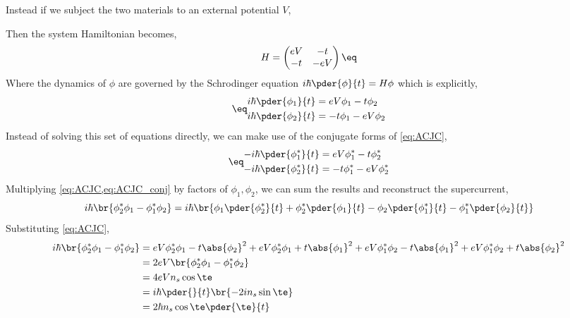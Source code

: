 \documentclass{article}
\begin{document}
Instead if we subject the two materials to an external potential $V$,
\begin{center}
\end{center}

Then the system Hamiltonian becomes,
\[ H = \begin{pmatrix}
    e V & - t \\
    -t & - e V
\end{pmatrix} \eq \label{eq:ACJC_H} \]
Where the dynamics of $\phi$ are governed by the Schrodinger equation $i \hbar \pder{\phi}{t} = H \phi$ which is explicitly,
\begin{align*}
\eq\label{eq:ACJC}
\begin{split}
    i\hbar \pder{\phi_1}{t} &= e V \phi_1 - t \phi_2 \\
    i\hbar \pder{\phi_2}{t} &= - t \phi_1 - e V \phi_2
\end{split}
\end{align*}
Instead of solving this set of equations directly, we can make use of the conjugate forms of \cref{eq:ACJC},
\begin{align*}
\eq\label{eq:ACJC_conj}
\begin{split}
    -i\hbar \pder{\phi_1^*}{t} &= e V \phi_1^* - t \phi_2^* \\
    -i\hbar \pder{\phi_2^*}{t} &= - t \phi_1^* - e V \phi_2^*
\end{split}
\end{align*}
Multiplying \cref{eq:ACJC,eq:ACJC_conj} by factors of $\phi_1, \phi_2$, we can sum the results and reconstruct the supercurrent,
\[ i\hbar \br{\phi_2^* \phi_1 - \phi_1^* \phi_2} = i \hbar \br{\phi_1 \pder{\phi_2^*}{t} + \phi_2^* \pder{\phi_1}{t} - \phi_2 \pder{\phi_1^*}{t} - \phi_1^* \pder{\phi_2}{t}}\]
Substituting \cref{eq:ACJC},
\begin{align*}
    i\hbar \br{\phi_2^* \phi_1 - \phi_1^* \phi_2}
    &= eV \phi_2^* \phi_1 - t \abs{\phi_2}^2 + e V \phi_2^* \phi_1 + t \abs{\phi_1}^2 + eV \phi_1^* \phi_2 - t \abs{\phi_1}^2 + e V \phi_1^* \phi_2 + t \abs{\phi_2}^2 \\
    &= 2 e V \br{\phi_2^* \phi_1 - \phi_1^* \phi_2} \\
    &= 4 e V n_s \cos \te \\
    &= i \hbar \pder{}{t}\br{-2 i n_s \sin \te} \\
    &= 2 \hbar n_s \cos \te \pder{\te}{t}
\end{align*}
\end{document}
